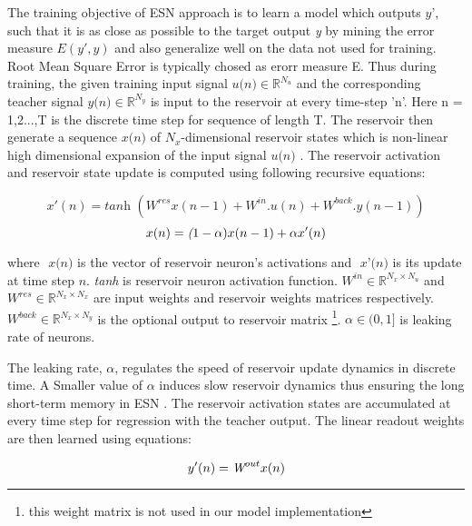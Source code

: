 The training objective of ESN approach is to learn a model which outputs $\textit{y'}$, such that it is as close as possible to the target output \textit{y} by mining the error measure $E(y',y)$ and also generalize well on the data not used for training. Root Mean Square Error is typically chosed as erorr measure E. Thus during training, the given training input signal $\textit{u(n)} \in \mathbb{R}^{N_u}$ and the corresponding teacher signal $\textit{y(n)} \in \mathbb{R}^{N_y}$  is input to the reservoir at every time-step 'n'. Here n = 1,2...,T is the discrete time step for sequence of length T. The reservoir then generate a sequence $\textit{x(n)}$ of $N_{x}$-dimensional reservoir states which is non-linear high dimensional expansion of the input signal $\textit{u(n)}$ \cite{esn:jaeger_tutorial}. The reservoir activation and reservoir state update is computed using following recursive equations:

\begin{equation} \label{eqn:res_update}
x'(n) =\textit {tanh } ( W^{res}x(n-1) + W^{in}.u(n) + W^{back}.y(n-1))
\end{equation}
\begin{equation} \label{eqn:res_state}
x(n) =\textit (1-\alpha) x(n-1) + \alpha x'(n)
\end{equation}

where $\textit{ x(n)}$ is the vector of reservoir neuron's activations and $\textit{ x'(n)}$ is its update at time step $\textit{n}$. \textit{tanh} is reservoir neuron activation function. $ W^{in} \in \mathbb{R}^{{N_x} \times{N_u}}$ and $ W^{res} \in \mathbb{R}^{{N_x} \times{N_x}} $ are input weights and reservoir weights matrices respectively. $ W^{back} \in \mathbb{R}^{{N_x} \times{N_y}} $ is the optional output to reservoir matrix \footnote{this weight matrix is not used in our model implementation}. $\alpha \in (0,1]$ is leaking rate of neurons.  

The leaking rate, $\alpha$, regulates the speed of reservoir update dynamics in discrete time. A Smaller value of $\alpha$  induces slow reservoir dynamics thus ensuring the long short-term memory in ESN \cite{esn:practical_guide, esn:optimization_leaky_neurons}. The reservoir activation states are accumulated at every time step for regression with the teacher output. The linear readout weights are then learned using equations:

\begin{equation}\label{eqn:esn_output}
y'(n) = \textit W^{out}x(n)
\end{equation}

